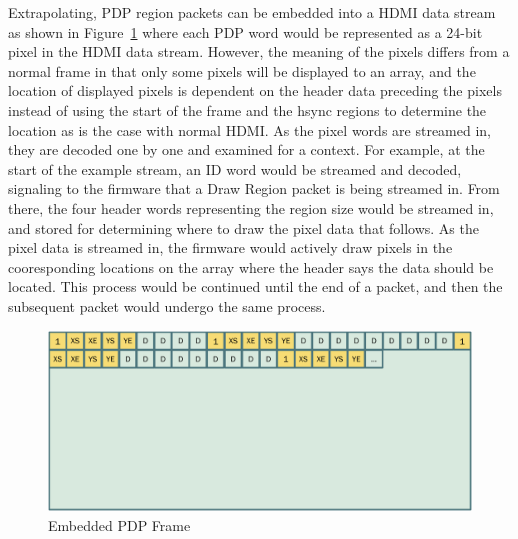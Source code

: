     Extrapolating, PDP region packets can be embedded into a HDMI data stream as shown in Figure~\ref{fig:embedded_frame} where each PDP word would be represented as a 24-bit pixel in the HDMI data stream. However, the meaning of the pixels differs from a normal frame in that only some pixels will be displayed to an array, and the location of displayed pixels is dependent on the header data preceding the pixels instead of using the start of the frame and the hsync regions to determine the location as is the case with normal HDMI. As the pixel words are streamed in, they are decoded one by one and examined for a context. For example, at the start of the example stream, an ID word would be streamed and decoded, signaling to the firmware that a Draw Region packet is being streamed in. From there, the four header words representing the region size would be streamed in, and stored for determining where to draw the pixel data that follows. As the pixel data is streamed in, the firmware would actively draw pixels in the cooresponding locations on the array where the header says the data should be located. This process would be continued until the end of a packet, and then the subsequent packet would undergo the same process.

    \begin{figure}
        \centering
        \includegraphics[width=1.0\textwidth]{fig/embedded_frame.pdf}
        \caption{Embedded PDP Frame}
        \label{fig:embedded_frame}
    \end{figure}

